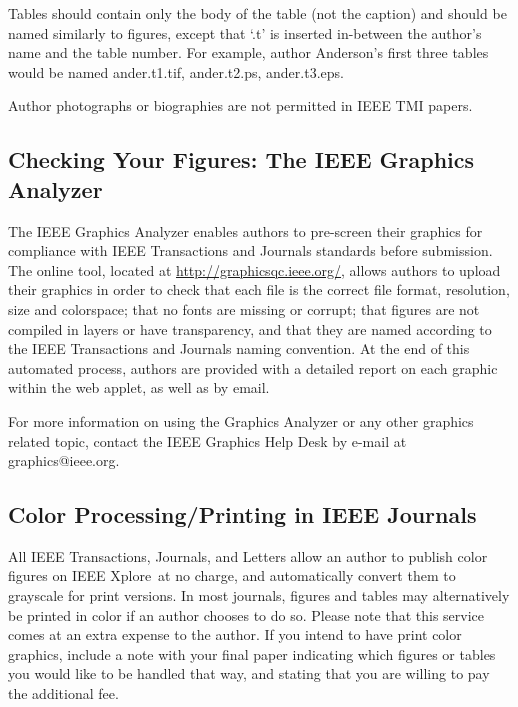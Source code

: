 \documentclass[journal,twoside,web]{ieeecolor}
\begin{document}
Tables should contain only the body of the table (not the caption) and
should be named similarly to figures, except that `.t' is inserted
in-between the author's name and the table number. For example, author
Anderson's first three tables would be named ander.t1.tif, ander.t2.ps, ander.t3.eps.

Author photographs or biographies are not permitted in IEEE TMI papers.

\subsection{Checking Your Figures: The IEEE Graphics Analyzer}
The IEEE Graphics Analyzer enables authors to pre-screen their graphics for
compliance with IEEE Transactions and Journals standards before submission.
The online tool, located at \underline{http://graphicsqc.ieee.org/},
allows authors to upload their graphics in order to check that each file is the correct file format,
resolution, size and colorspace; that no fonts are missing or corrupt;
that figures are not compiled in layers or have transparency,
and that they are named according to the IEEE Transactions and Journals naming convention.
At the end of this automated process, authors are provided with
a detailed report on each graphic within the web applet, as well as by email.

For more information on using the Graphics Analyzer or any other graphics
related topic, contact the IEEE Graphics Help Desk by e-mail at
graphics@ieee.org.

\subsection{Color Processing/Printing in IEEE Journals}
All IEEE Transactions, Journals, and Letters allow an author to publish
color figures on IEEE Xplore\textregistered\ at no charge, and automatically
convert them to grayscale for print versions. In most journals, figures and
tables may alternatively be printed in color if an author chooses to do so.
Please note that this service comes at an extra expense to the author. If
you intend to have print color graphics, include a note with your final
paper indicating which figures or tables you would like to be handled that way,
and stating that you are willing to pay the additional fee.
\end{document}
